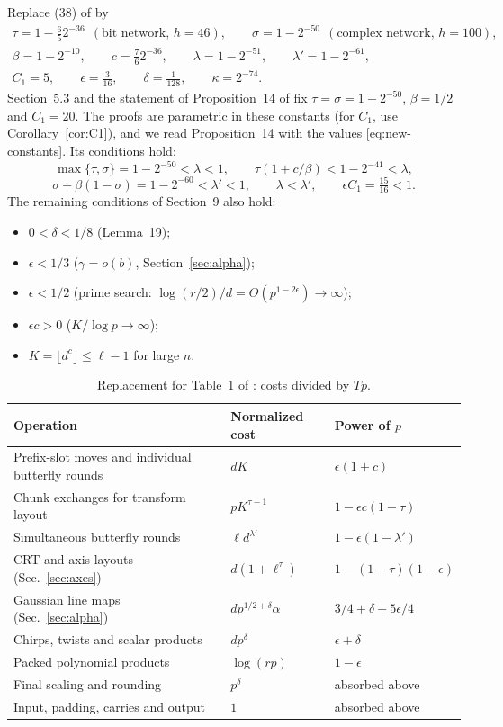 \documentclass[11pt]{article}
\numberwithin{equation}{section}
\numberwithin{table}{section}
\theoremstyle{remark}
\newcommand{\OAI}{\cite{OAI}}
\begin{document}
Replace (38) of \OAI{} by
\begin{equation}\label{eq:new-constants}
\begin{gathered}
 \tau=1-\tfrac65 2^{-36}\ \ (\text{bit network, }h=46),\qquad
 \sigma=1-2^{-50}\ \ (\text{complex network, }h=100),\\
 \beta=1-2^{-10},\qquad c=\tfrac76 2^{-36},\qquad
 \lambda=1-2^{-51},\qquad \lambda'=1-2^{-61},\\
 C_1=5,\qquad \epsilon=\tfrac3{16},\qquad \delta=\tfrac1{128},\qquad
 \kappa=2^{-74}.
\end{gathered}
\end{equation}
Section~5.3 and the statement of Proposition~14 of \OAI{} fix
$\tau=\sigma=1-2^{-50}$, $\beta=1/2$ and $C_1=20$. The proofs are
parametric in these constants (for $C_1$, use
Corollary~\ref{cor:C1}), and we read Proposition~14 with the values
\eqref{eq:new-constants}. Its conditions hold:
\[
 \max\{\tau,\sigma\}=1-2^{-50}<\lambda<1,\qquad
 \tau(1+c/\beta)<1-2^{-41}<\lambda,
\]
\[
 \sigma+\beta(1-\sigma)=1-2^{-60}<\lambda'<1,\qquad
 \lambda<\lambda',\qquad
 \epsilon C_1=\tfrac{15}{16}<1.
\]
The remaining conditions of Section~9 also hold:
\begin{itemize}
\item $0<\delta<1/8$ (Lemma~19);
\item $\epsilon<1/3$ ($\gamma=o(b)$, Section~\ref{sec:alpha});
\item $\epsilon<1/2$ (prime search: $\log(r/2)/d=\Theta(p^{1-2\epsilon})\to\infty$);
\item $\epsilon c>0$ ($K/\log p\to\infty$);
\item $K=\lfloor d^c\rfloor\le\ell-1$ for large $n$.
\end{itemize}

\begin{table}[ht]
\centering
\small
\begin{tabular}{@{}>{\raggedright\arraybackslash}p{.42\linewidth}ll@{}}
\toprule
Operation & Normalized cost & Power of $p$\\
\midrule
Prefix-slot moves and individual butterfly rounds & $dK$ & $\epsilon(1+c)$\\
Chunk exchanges for transform layout & $pK^{\tau-1}$ & $1-\epsilon c(1-\tau)$\\
Simultaneous butterfly rounds & $\ell d^{\lambda'}$ & $1-\epsilon(1-\lambda')$\\
CRT and axis layouts (Sec.~\ref{sec:axes}) & $d(1+\ell^\tau)$ & $1-(1-\tau)(1-\epsilon)$\\
Gaussian line maps (Sec.~\ref{sec:alpha}) & $dp^{1/2+\delta}\alpha$ & $3/4+\delta+5\epsilon/4$\\
Chirps, twists and scalar products & $dp^\delta$ & $\epsilon+\delta$\\
Packed polynomial products & $\log(rp)$ & $1-\epsilon$\\
Final scaling and rounding & $p^\delta$ & absorbed above\\
Input, padding, carries and output & $1$ & absorbed above\\
\bottomrule
\end{tabular}
\caption{Replacement for Table~1 of \OAI: costs divided by $Tp$.}
\label{tab:costs}
\end{table}
\end{document}
